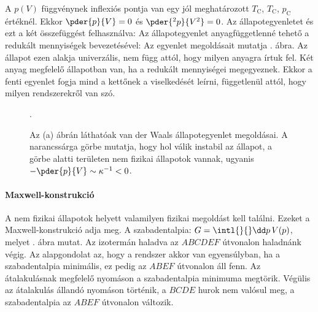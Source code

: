    A $p(V)$ függvénynek inflexiós pontja van egy jól meghatározott $T_\text{C}$, $T_\text{C}$, $p_\text{C}$ értéknél.
   Ekkor $\pder{p}{V}=0$ és $\pder{^2p}{V^2}=0$.
   Az állapotegyenletet és ezt a két összefüggést felhasználva:
   Az állapotegyenlet anyagfüggetlenné tehető a redukált mennyiségek bevezetésével:
   Az egyenlet megoldásait mutatja . ábra.
   Az állapot ezen alakja univerzális, nem függ attól, hogy milyen anyagra írtuk fel.
   Két anyag megfelelő állapotban van, ha a redukált mennyiségei megegyeznek.
   Ekkor a fenti egyenlet fogja mind a kettőnek a viselkedését leírni, függetlenül attól, hogy milyen rendszerekről van szó.
   
   \begin{figure}[ht!]
    \centering
     \hspace{6pt}
     \hspace{6pt}
    \caption{Az (a) ábrán láthatóak van der Waals állapotegyenlet megoldásai.
   A narancssárga görbe mutatja, hogy hol válik instabil az állapot, a görbe alatti területen nem fizikai állapotok vannak, ugyanis $-\pder{p}{V}\sim\kappa^{-1}<0$.}. \label{fig:B09-vdW}
   \end{figure}
   
   \paragraph{Maxwell-konstrukció}
   
    A nem fizikai állapotok helyett valamilyen fizikai megoldást kell találni.
   Ezeket a Maxwell-konstrukció adja meg.
   A szabadentalpia: $G=\intl{}{}\dd p\, V(p)$, melyet . ábra mutat.
   Az izotermán haladva az $ABCDEF$ útvonalon haladnánk végig.
   Az alapgondolat az, hogy a rendszer akkor van egyensúlyban, ha a szabadentalpia minimális, ez pedig az $ABEF$ útvonalon áll fenn.
   Az átalakulásnak megfelelő nyomáson a szabadentalpia minimuma megtörik.
   Végülis az átalakulás állandó nyomáson történik, a $BCDE$ hurok nem valósul meg, a szabadentalpia az $ABEF$ útvonalon változik.
   
